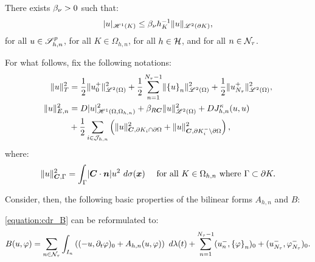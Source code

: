 \begin{lemma}
    There exists $\beta_{\nu} > 0$ such that:
    \begin{gather}
        \lvert u \rvert_{\mathscr{H}^{1}(K)} \leq \beta_{\nu} h_K^{-1} \lVert u \rVert_{\mathscr{L}^{2}(\partial K)},
    \end{gather}
    for all $u \in \mathscr{S}^p_{h, n}$, for all $K \in \Omega_{h, n}$, for all $h \in \mathcal{H}$, and for all $n \in \mathcal{N}_{\tau}$.
\end{lemma}

For what follows, fix the following notations:
\begin{align} %
    \lVert u \rVert_{T}^2 &= \frac{1}{2} \lVert u_0^+ \rVert_{\SpaceLp{2}(\Omega)}^2 + \frac{1}{2} \sum_{n = 1}^{\nTimeIndices - 1} \lVert \left\{ u \right\}_n \rVert_{\SpaceLp{2}(\Omega)}^2 + \frac{1}{2} \lVert u_{\nTimeIndices}^+ \rVert_{\SpaceLp{2}(\Omega)}^2, \\
    \lVert u \rVert_{E, n}^2 &= \Diffusion \lvert u \rvert_{\SpaceHk{1}(\Omega, \Omega_{h, n})}^2 + \BoundC{\Reaction \Convection} \lVert u \rVert_{\SpaceLp{2}(\Omega)}^2 + \Diffusion J^{\kappa}_{h, n}(u, u) \\
    &+ \frac{1}{2} \sum_{i \in \SpaceTimeIndices} \left( \lVert u \rVert_{\Convection, \partial K_i \cap \partial \Omega}^2 + \lVert u \rVert_{\Convection, \partial K_i^- \setminus \partial \Omega}^2 \right),
\end{align}
where:
\begin{gather}
    \lVert u \rVert_{\bm{C}, \Gamma}^2 = \int_{\Gamma} \lvert \bm{C} \cdot \bm{n} \rvert u^2 ~ d \sigma(\bm{x}) \quad \text{ for all } K \in \Omega_{h, n} \text{ where } \Gamma \subset \partial K.
\end{gather}

Consider, then, the following basic properties of the bilinear forms $A_{h, n}$ and $B$:

\begin{lemma}[Reformulation of $B$]
    \eqref{equation:cdr_B} can be reformulated to:
    \begin{gather}
        B(u, \varphi) = \sum_{n \in \mathcal{N}_{\tau}} \int_{I_n} \left( (-u, \partial_t \varphi )_0 + A_{h, n}(u, \varphi) \right) ~ d \lambda(t) + \sum_{n = 1}^{N_{\tau} - 1} (u_n^-, \left\{ \varphi \right\}_n )_0 + (u_{N_{\tau}}^-, \varphi_{N_{\tau}}^-)_0. \label{equation:cdr_B_reformulated}
    \end{gather}
\end{lemma}

